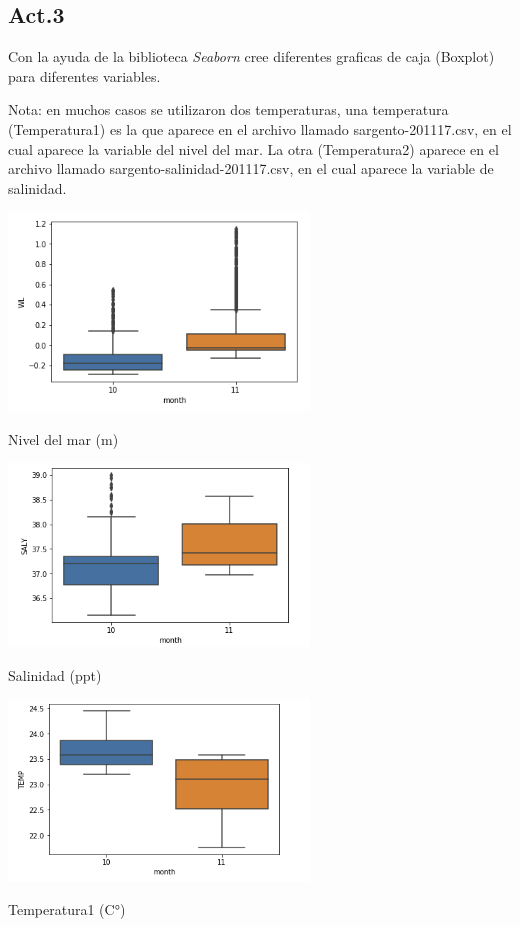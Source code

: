 \documentclass{article}
\begin{document}
\subsection*{Act.3}
Con la ayuda de la biblioteca \textit{Seaborn} cree diferentes graficas de caja (Boxplot) para diferentes variables.

\vspace{0.2cm}

Nota: en muchos casos se utilizaron dos temperaturas, una temperatura (Temperatura1) es la que aparece en el archivo llamado sargento-201117.csv, en el cual aparece la variable del nivel del mar. La otra (Temperatura2) aparece en el archivo llamado sargento-salinidad-201117.csv, en el cual aparece la variable de salinidad.

\begin{center}
	\includegraphics[width=8cm]{BxPltWL.png}
    
    Nivel del mar (m)
\end{center}
\vspace{0.3cm}

\begin{center}
	\includegraphics[width=8cm]{BxPltSALY.png}
    
    Salinidad (ppt)
\end{center}
\vspace{0.3cm}

\begin{center}
	\includegraphics[width=8cm]{BxPltTEMPWL.png}
    
    Temperatura1 (C°) 
\end{center}
\vspace{0.3cm}
\end{document}
